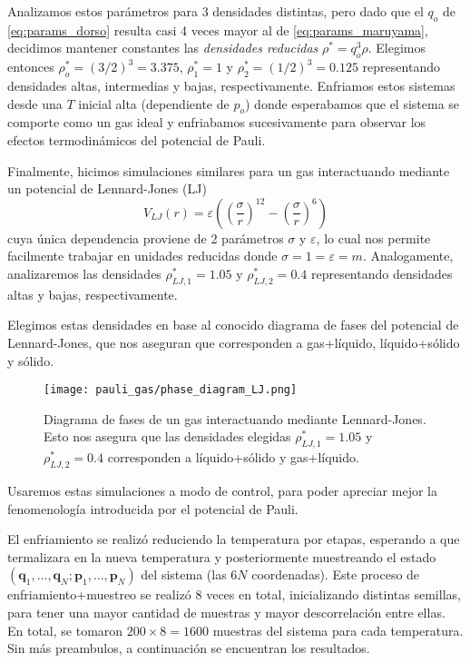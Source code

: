 Analizamos estos parámetros para 3 densidades distintas, pero dado que el $q_o$ de \eqref{eq:params_dorso} resulta casi 4 veces mayor al de \eqref{eq:params_maruyama}, decidimos mantener
constantes las \textit{densidades reducidas} $\rho^* = q_o^3\rho$.
Elegimos entonces $\rho_o^* = (3/2)^3 = 3.375 $, $\rho_1^* = 1 $ y $\rho_2^* = (1/2)^3 = 0.125 $ representando densidades altas, intermedias y bajas, respectivamente.
Enfriamos estos sistemas desde una $T$ inicial alta (dependiente de $p_o$) donde esperabamos que el sistema se comporte como un gas ideal y enfriabamos sucesivamente para observar los
efectos termodinámicos del potencial de Pauli.

Finalmente, hicimos simulaciones similares para un gas interactuando mediante un potencial de Lennard-Jones (LJ)
\[ V_{LJ}(r) = \varepsilon\left( \left( \frac{\sigma}{r} \right)^{12} - \left( \frac{\sigma}{r} \right)^6 \right) \]
cuya única dependencia proviene de 2 parámetros $\sigma$ y $\varepsilon$, lo cual nos permite facilmente trabajar en unidades reducidas donde $\sigma=1=\varepsilon=m$.
Analogamente, analizaremos las densidades $\rho_{LJ,1}^* = 1.05$ y $\rho_{LJ,2}^* = 0.4$ representando densidades altas y bajas, respectivamente.

Elegimos estas densidades en base al conocido diagrama de fases del potencial de Lennard-Jones, que nos aseguran que corresponden a gas+líquido, líquido+sólido y sólido.

\begin{figure}[h]
	\centering
	\texttt{[image: pauli\_gas/phase\_diagram\_LJ.png]}
	\caption{Diagrama de fases de un gas interactuando mediante Lennard-Jones. 
	Esto nos asegura que las densidades elegidas $\rho_{LJ,1}^* = 1.05$ y $\rho_{LJ,2}^* = 0.4$ corresponden a líquido+sólido y gas+líquido.}
	\label{fig:ej_diag_fases}
\end{figure}

Usaremos estas simulaciones a modo de control, para poder apreciar mejor la fenomenología introducida por el potencial de Pauli.

El enfriamiento se realizó reduciendo la temperatura por etapas, esperando a que termalizara en la nueva temperatura y posteriormente muestreando el estado 
$(\mathbf{q}_1, ..., \mathbf{q}_N;\mathbf{p}_1, ..., \mathbf{p}_N)$ del sistema (las $6N$ coordenadas).
Este proceso de enfriamiento+muestreo se realizó 8 veces en total, inicializando distintas semillas, para tener una mayor cantidad de muestras y mayor descorrelación entre ellas.
En total, se tomaron $200\times 8 = 1600$ muestras del sistema para cada temperatura.
Sin más preambulos, a continuación se encuentran los resultados.


